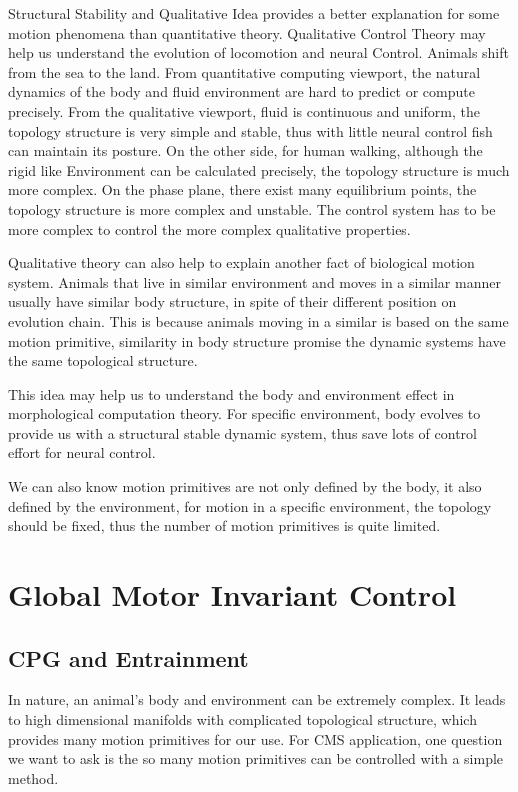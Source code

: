 Structural Stability and Qualitative Idea provides a better explanation for some motion phenomena than quantitative theory.
Qualitative Control Theory may help us understand the evolution of locomotion and neural Control.
Animals shift from the sea to the land. From quantitative computing viewport, the natural dynamics of the body and fluid environment are hard to predict or compute precisely. From the qualitative viewport, fluid is continuous
and uniform, the topology structure is very simple and stable, thus with little neural control fish can maintain its posture. On the other side, for human walking, although the rigid like
Environment can be calculated precisely, the topology structure is much more complex. On
the phase plane, there exist many equilibrium points, the topology structure is more complex and unstable. The control system has to be more complex to control the more complex qualitative properties.

Qualitative theory can also help to explain another fact of biological motion system. Animals that live in similar environment and moves in a similar manner usually have similar body structure, in spite of their different position on evolution chain. This is because animals moving in a similar is based on the same motion primitive, similarity in body structure promise the dynamic systems have the same topological structure.

This idea may help us to understand the body and environment effect in morphological computation theory. 
For specific environment, body evolves to provide us with a structural stable dynamic system, thus save lots of control effort for neural control.

We can also know motion primitives are not only defined by the body, it also defined by the environment, for motion in a specific environment, the topology should be fixed, thus the number of motion primitives is quite limited.


\section{Global Motor Invariant Control}
\subsection{CPG and Entrainment}
In nature, an animal's body and environment can be extremely complex. 
It leads to high dimensional manifolds with complicated topological structure, which provides many motion primitives for our use.
For CMS application, one question we want to ask is the so many motion primitives can be controlled with a simple method.

